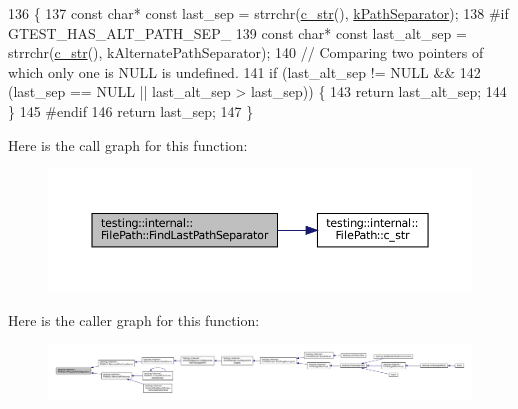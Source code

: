 \begin{DoxyCode}
136                                                   \{
137   \textcolor{keyword}{const} \textcolor{keywordtype}{char}* \textcolor{keyword}{const} last\_sep = strrchr(\hyperlink{classtesting_1_1internal_1_1FilePath_a43e9ff978b0d7c43c401d976d4621aa3}{c\_str}(), \hyperlink{namespacetesting_1_1internal_afcd71adaa9d1e6df7b282a17fc48125c}{kPathSeparator});
138 \textcolor{preprocessor}{#if GTEST\_HAS\_ALT\_PATH\_SEP\_}
139   \textcolor{keyword}{const} \textcolor{keywordtype}{char}* \textcolor{keyword}{const} last\_alt\_sep = strrchr(\hyperlink{classtesting_1_1internal_1_1FilePath_a43e9ff978b0d7c43c401d976d4621aa3}{c\_str}(), kAlternatePathSeparator);
140   \textcolor{comment}{// Comparing two pointers of which only one is NULL is undefined.}
141   \textcolor{keywordflow}{if} (last\_alt\_sep != NULL &&
142       (last\_sep == NULL || last\_alt\_sep > last\_sep)) \{
143     \textcolor{keywordflow}{return} last\_alt\_sep;
144   \}
145 \textcolor{preprocessor}{#endif}
146   \textcolor{keywordflow}{return} last\_sep;
147 \}
\end{DoxyCode}
Here is the call graph for this function\+:
\nopagebreak
\begin{figure}[H]
\begin{center}
\leavevmode
\includegraphics[width=350pt]{classtesting_1_1internal_1_1FilePath_ab47f288e1e9ce5a904eccb94e86c4f99_cgraph}
\end{center}
\end{figure}
Here is the caller graph for this function\+:
\nopagebreak
\begin{figure}[H]
\begin{center}
\leavevmode
\includegraphics[width=350pt]{classtesting_1_1internal_1_1FilePath_ab47f288e1e9ce5a904eccb94e86c4f99_icgraph}
\end{center}
\end{figure}
\mbox{\label{classtesting_1_1internal_1_1FilePath_a2280a77adb394cf80bb5f73fc292e8c8}} 
